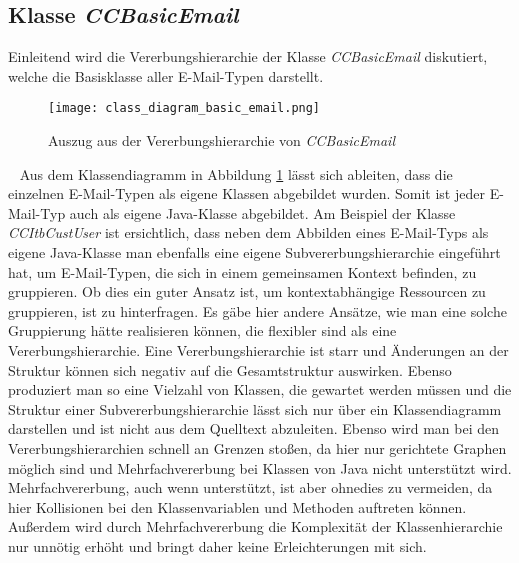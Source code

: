 \subsection{Klasse \emph{CCBasicEmail}}
\label{sec:implementierung-ccbasic-mail}
Einleitend wird die Vererbungshierarchie der Klasse \emph{CCBasicEmail} diskutiert, welche die Basisklasse aller E-Mail-Typen darstellt.
\begin{figure}[h]
\centering
\texttt{[image: class\_diagram\_basic\_email.png]} 
\caption{Auszug aus der Vererbungshierarchie von \emph{CCBasicEmail}}
\label{fig:klassen-hierarchie-ccbasicemail}
\end{figure}
\ \newline
Aus dem Klassendiagramm in Abbildung \ref{fig:klassen-hierarchie-ccbasicemail} lässt sich ableiten, dass die einzelnen E-Mail-Typen als eigene Klassen abgebildet wurden. Somit ist jeder E-Mail-Typ auch als eigene Java-Klasse abgebildet. 
\newline
\newline
Am Beispiel der Klasse \emph{CCItbCustUser} ist ersichtlich, dass neben dem Abbilden eines E-Mail-Typs als eigene Java-Klasse man ebenfalls eine eigene Subvererbungshierarchie eingeführt hat, um E-Mail-Typen, die sich in einem gemeinsamen Kontext befinden, zu gruppieren. Ob dies ein guter Ansatz ist, um kontextabhängige Ressourcen zu gruppieren, ist zu hinterfragen. Es gäbe hier andere Ansätze, wie man eine solche Gruppierung hätte realisieren können, die flexibler sind als eine Vererbungshierarchie. Eine Vererbungshierarchie ist starr und Änderungen an der Struktur können sich negativ auf die Gesamtstruktur auswirken. Ebenso produziert man so eine Vielzahl von Klassen, die gewartet werden müssen und die Struktur einer Subvererbungshierarchie lässt sich nur über ein Klassendiagramm darstellen und ist nicht aus dem Quelltext abzuleiten. Ebenso wird man bei den Vererbungshierarchien schnell an Grenzen stoßen, da hier nur gerichtete Graphen möglich sind und Mehrfachvererbung bei Klassen von Java nicht unterstützt wird. 
\newline
\newline
Mehrfachvererbung, auch wenn unterstützt, ist aber ohnedies zu vermeiden, da hier Kollisionen bei den Klassenvariablen und Methoden auftreten können. Außerdem wird durch Mehrfachvererbung die Komplexität der Klassenhierarchie nur unnötig erhöht und bringt daher keine Erleichterungen mit sich.

